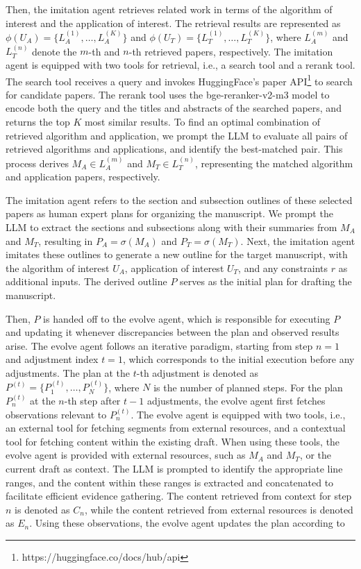 \documentclass[manuscript,review,anonymous]{acmart}
\begin{document}
Then, the imitation agent retrieves related work in terms of the algorithm of interest and the application of interest. The retrieval results are represented as $\phi(U_A) = \{L_A^{(1)}, \ldots, L_A^{(K)}\}$ and $\phi(U_T) = \{L_T^{(1)}, \ldots, L_T^{(K)}\}$, where $L_A^{(m)}$ and $L_T^{(n)}$ denote the $m$-th and $n$-th retrieved papers, respectively. The imitation agent is equipped with two tools for retrieval, i.e., a search tool and a rerank tool. The search tool receives a query and invokes HuggingFace's paper API\footnote{https://huggingface.co/docs/hub/api} to search for candidate papers. The rerank tool uses the bge-reranker-v2-m3 \cite{chen2024bge} model to encode both the query and the titles and abstracts of the searched papers, and returns the top $K$ most similar results. To find an optimal combination of retrieved algorithm and application, we prompt the LLM to evaluate all pairs of retrieved algorithms and applications, and identify the best-matched pair. This process derives $M_A \in {L_A^{(m)}}$ and $M_T \in {L_T^{(n)}}$, representing the matched algorithm and application papers, respectively.

The imitation agent refers to the section and subsection outlines of these selected papers as human expert plans for organizing the manuscript. We prompt the LLM to extract the sections and subsections along with their summaries from $M_A$ and $M_T$, resulting in $P_A = \sigma(M_A)$ and $P_T = \sigma(M_T)$. Next, the imitation agent imitates these outlines to generate a new outline for the target manuscript, with the algorithm of interest $U_A$, application of interest $U_T$, and any constraints $r$ as additional inputs. The derived outline $P$ serves as the initial plan for drafting the manuscript.

Then, $P$ is handed off to the evolve agent, which is responsible for executing $P$ and updating it whenever discrepancies between the plan and observed results arise. The evolve agent follows an iterative paradigm, starting from step $n = 1$ and adjustment index $t = 1$, which corresponds to the initial execution before any adjustments. The plan at the $t$-th adjustment is denoted as $P^{(t)} = \{P_1^{(t)}, \ldots, P_N^{(t)}\}$, where $N$ is the number of planned steps. For the plan $P_n^{(t)}$ at the $n$-th step after $t-1$ adjustments, the evolve agent first fetches observations relevant to $P_n^{(t)}$. The evolve agent is equipped with two tools, i.e., an external tool for fetching segments from external resources, and a contextual tool for fetching content within the existing draft. When using these tools, the evolve agent is provided with external resources, such as $M_A$ and $M_T$, or the current draft as context. The LLM is prompted to identify the appropriate line ranges, and the content within these ranges is extracted and concatenated to facilitate efficient evidence gathering. The content retrieved from context for step $n$ is denoted as $C_n$, while the content retrieved from external resources is denoted as $E_n$. Using these observations, the evolve agent updates the plan according to
\end{document}
